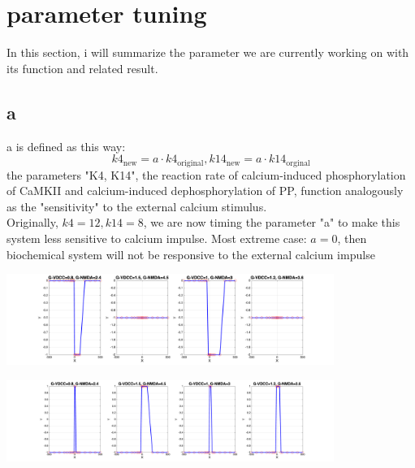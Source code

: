 \documentclass{article}
\begin{document}
\newpage
\section{parameter tuning}
In this section, i will summarize the parameter we are currently working on with its function and related result.
\subsection{a}
a is defined as this way:\[
k4_{\text{new}}=a\cdot k4_{\text{original}}, k14_{\text{new}}=a\cdot k14_{\text{orginal}}
\]
the parameters "K4, K14", the reaction rate of calcium-induced phosphorylation of CaMKII and calcium-induced dephosphorylation of PP, function analogously as the "sensitivity" to the external calcium stimulus.\\
Originally, $k4=12,k14=8$, we are now timing the parameter "a" to make this system less sensitive to calcium impulse. Most extreme case: $a=0$, then biochemical system will not be responsive to the external calcium impulse\\
\begin{minipage}{\textwidth} %
    \centering
    \includegraphics[width=0.8\textwidth]{a=0.1.png} %
    \label{fig:a0.1}
\end{minipage}

\vspace{0.5cm} %

\begin{minipage}{\textwidth} %
    \centering
    \includegraphics[width=0.8\textwidth]{a=0.25.png} %
    \label{fig:a0.25}
\end{minipage}
\end{document}
